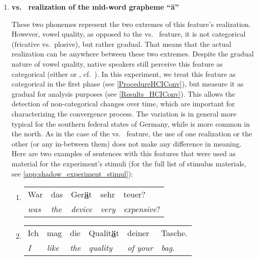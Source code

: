 \begin{enumerate}
	\item \textbf{\textipa{[e:]} vs.\ \textipa{[E:]} realization of the mid-word grapheme \enquote{ä}}
	
	These two phonemes represent the two extremes of this feature's realization.
	However, vowel quality, as opposed to the \textipa{[\c{c}]} vs.\ \textipa{[k]} feature, it is not categorical (fricative vs.\ plosive), but rather gradual.
	That means that the actual realization can be anywhere between these two extremes.
	Despite the gradual nature of vowel quality, native speakers still perceive this feature as categorical (either \textipa{[e]} or \textipa{[E]}, cf.\ \citet{Kuhl2004early, Kuhl1991human}).
	In this experiment, we treat this feature as categorical in the first phase (see \cref{ProcedureHCIConv}), but measure it as gradual for analysis purposes (see \cref{Results_HCIConv}).
	This allows the detection of non-categorical changes over time, which are important for characterizing the convergence process.
	The \textipa{[E]} variation is in general more typical for the southern federal states of Germany, while \textipa{[e]} is more common in the north.
	As in the case of the \textipa{[\c{c}]} vs.\ \textipa{[k]} feature, the use of one realization or the other (or any in-between them) does not make any difference in meaning.
	Here are two examples of sentences with this features that were used as material for the experiment's stimuli (for the full list of stimulus materials, see \autoref{app:shadow_experiment_stimul}):
	
	\begin{enumerate}[label=\arabic{enumi}\alph*), ref=\arabic{enumi}\alph*.)]
		\item 
		\begin{tabulary}{\linewidth}{LLLLL}
			War & das & Ger\textbf{\underline{ä}}t & sehr & teuer?\\
			\textit{was} & \textit{the} & \textit{device} & \textit{very} & \textit{expensive}?\\
		\end{tabulary}
		\item
		\begin{tabulary}{\linewidth}{LLLLLL}
			Ich & mag & die & Qualit\textbf{\underline{ä}}t & deiner & Tasche.\\
			\textit{I} & \textit{like} & \textit{the} & \textit{quality} & \textit{of your} & \textit{bag}.\\
		\end{tabulary}
	\end{enumerate}
	

\end{enumerate}
